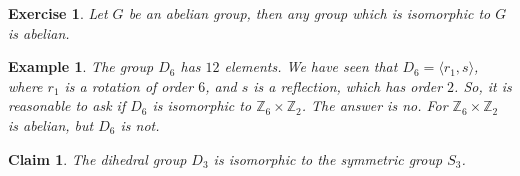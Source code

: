 \documentclass[a4paper,12pt]{report}
\newcounter{statement}
\numberwithin{statement}{chapter}
\newtheorem{claim}[statement]{Claim}
\newtheorem{eg}[statement]{\bf Example}
\newtheorem{ex}[statement]{\bf Exercise}
\numberwithin{equation}{chapter}
\numberwithin{section}{chapter}
\numberwithin{subsection}{section}
\begin{document}
\begin{ex}
Let $G$ be an abelian group, then any group which is isomorphic to $G$ is abelian.
\end{ex}
\begin{eg}

The group $D_6$ has $12$ elements.  We have seen that $D_6 = \langle r_1, s\rangle$, where $r_1$ is a rotation of order $6$,
and $s$ is a reflection, which has order $2$.  So, it is reasonable to ask if $D_6$ is isomorphic to $\mathbb{Z}_6 \times \mathbb{Z}_2$.  The answer is no.
For $\mathbb{Z}_6 \times \mathbb{Z}_2$ is abelian, but $D_6$ is not.

\end{eg}




\begin{claim}
The dihedral group $D_3$ is isomorphic to the symmetric group $S_3$.
\end{claim}
\end{document}
